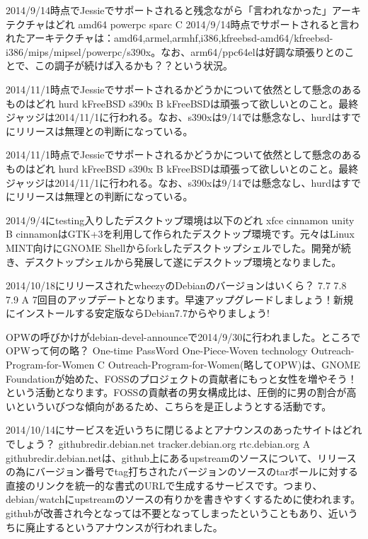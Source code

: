 %

\santaku
{2014/9/14時点でJessieでサポートされると残念ながら「言われなかった」アーキテクチャはどれ}
{amd64}
{powerpc}
{sparc}
{C}
{2014/9/14時点でサポートされると言われたアーキテクチャは：amd64,armel,armhf,i386,kfreebsd-amd64/kfreebsd-i386/mips/mipsel/powerpc/s390x。なお、arm64/ppc64elは好調な頑張りとのことで、この調子が続けば入るかも？？という状況。}

\santaku
{2014/11/1時点でJessieでサポートされるかどうかについて依然として懸念のあるものはどれ}
{hurd}
{kFreeBSD}
{s390x}
{B}
{kFreeBSDは頑張って欲しいとのこと。最終ジャッジは2014/11/1に行われる。なお、s390xは9/14では懸念なし、hurdはすでにリリースは無理との判断になっている。}

\santaku
{2014/11/1時点でJessieでサポートされるかどうかについて依然として懸念のあるものはどれ}
{hurd}
{kFreeBSD}
{s390x}
{B}
{kFreeBSDは頑張って欲しいとのこと。最終ジャッジは2014/11/1に行われる。なお、s390xは9/14では懸念なし、hurdはすでにリリースは無理との判断になっている。}

\santaku
{2014/9/4にtesting入りしたデスクトップ環境は以下のどれ}
{xfce}
{cinnamon}
{unity}
{B}
{cinnamonはGTK+3を利用して作られたデスクトップ環境です。元々はLinux MINT向けにGNOME Shellからforkしたデスクトップシェルでした。開発が続き、デスクトップシェルから発展して遂にデスクトップ環境となりました。}

\santaku
{2014/10/18にリリースされたwheezyのDebianのバージョンはいくら？}
{7.7}
{7.8}
{7.9}
{A}
{7回目のアップデートとなります。早速アップグレードしましょう！新規にインストールする安定版ならDebian7.7からやりましょう!}

\santaku
{OPWの呼びかけがdebian-devel-announceで2014/9/30に行われました。ところでOPWって何の略？}
{One-time PassWord}
{One-Piece-Woven technology}
{Outreach-Program-for-Women}
{C}
{Outreach-Program-for-Women(略してOPW)は、GNOME Foundationが始めた、FOSSのプロジェクトの貢献者にもっと女性を増やそう！という活動となります。FOSSの貢献者の男女構成比は、圧倒的に男の割合が高いといういびつな傾向があるため、こちらを是正しようとする活動です。}

\santaku
{2014/10/14にサービスを近いうちに閉じるよとアナウンスのあったサイトはどれでしょう？}
{githubredir.debian.net}
{tracker.debian.org}
{rtc.debian.org}
{A}
{githubredir.debian.netは、github上にあるupstreamのソースについて、リリースの為にバージョン番号でtag打ちされたバージョンのソースのtarボールに対する直接のリンクを統一的な書式のURLで生成するサービスです。つまり、debian/watchにupstreamのソースの有りかを書きやすくするために使われます。githubが改善され今となっては不要となってしまったということもあり、近いうちに廃止するというアナウンスが行われました。}


